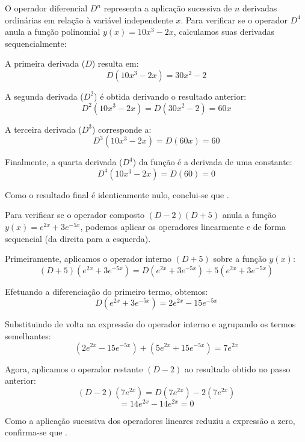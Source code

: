 \documentclass[oneside,12pt,a4paper]{report}
\begin{document}
\begin{resolucao}
    \itemresolucao O operador diferencial $D^n$ representa a aplicação sucessiva de $n$ derivadas ordinárias em relação à variável independente $x$. Para verificar se o operador $D^4$ anula a função polinomial $y(x) = 10x^3 - 2x$, calculamos suas derivadas sequencialmente:

    A primeira derivada ($D$) resulta em:
    \[D(10x^3 - 2x) = 30x^2 - 2\]

    A segunda derivada ($D^2$) é obtida derivando o resultado anterior:
    \[D^2(10x^3 - 2x) = D(30x^2 - 2) = 60x\]

    A terceira derivada ($D^3$) corresponde a:
    \[D^3(10x^3 - 2x) = D(60x) = 60\]

    Finalmente, a quarta derivada ($D^4$) da função é a derivada de uma constante:
    \[D^4(10x^3 - 2x) = D(60) = 0\]

    Como o resultado final é identicamente nulo, conclui-se que .

    \itemresolucao Para verificar se o operador composto $(D - 2)(D + 5)$ anula a função $y(x) = e^{2x} + 3e^{-5x}$, podemos aplicar os operadores linearmente e de forma sequencial (da direita para a esquerda).

    Primeiramente, aplicamos o operador interno $(D + 5)$ sobre a função $y(x)$:
    \[(D + 5)(e^{2x} + 3e^{-5x}) = D(e^{2x} + 3e^{-5x}) + 5(e^{2x} + 3e^{-5x})\]

    Efetuando a diferenciação do primeiro termo, obtemos:
    \[D(e^{2x} + 3e^{-5x}) = 2e^{2x} - 15e^{-5x}\]

    Substituindo de volta na expressão do operador interno e agrupando os termos semelhantes:
    \[(2e^{2x} - 15e^{-5x}) + (5e^{2x} + 15e^{-5x}) = 7e^{2x}\]

    Agora, aplicamos o operador restante $(D - 2)$ ao resultado obtido no passo anterior:
    \[(D - 2)(7e^{2x}) = D(7e^{2x}) - 2(7e^{2x})\]
    \[= 14e^{2x} - 14e^{2x} = 0\]

    Como a aplicação sucessiva dos operadores lineares reduziu a expressão a zero, confirma-se que .
\end{resolucao}
\end{document}
